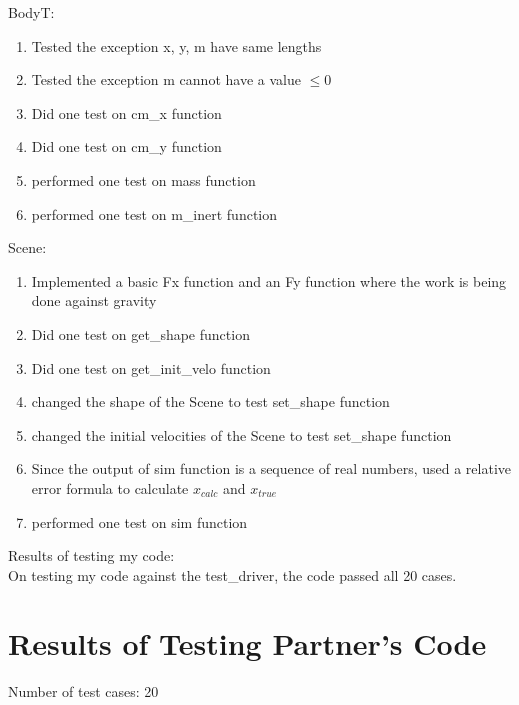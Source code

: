 \documentclass[12pt]{article}
\begin{document}
\noindent BodyT:
\begin{enumerate}
    \item Tested the exception x, y, m have same lengths
    
    \item Tested the exception m cannot have a value $\le 0$
    
    \item Did one test on cm\_x function
    
    \item Did one test on cm\_y function
    
    \item performed one test on mass function
    
    \item performed one test on m\_inert function\\
    
\end{enumerate}

\noindent Scene:
\begin{enumerate}
    \item Implemented a basic Fx function and an Fy function where the work is being done against gravity
    
    \item Did one test on get\_shape function
    
    \item Did one test on get\_init\_velo function
    
    \item changed the shape of the Scene to test set\_shape function
    
    \item changed the initial velocities of the Scene to test set\_shape function
    
    \item Since the output of sim function is a sequence of real numbers, used a relative error formula to calculate $x_{calc}$ and $x_{true}$
    
    \item performed one test on sim function\\
    
\end{enumerate}

\noindent Results of testing my code:\\

On testing my code against the test\_driver, the code passed all 20 cases.
\section{Results of Testing Partner's Code}
Number of test cases: 20\\
\end{document}
